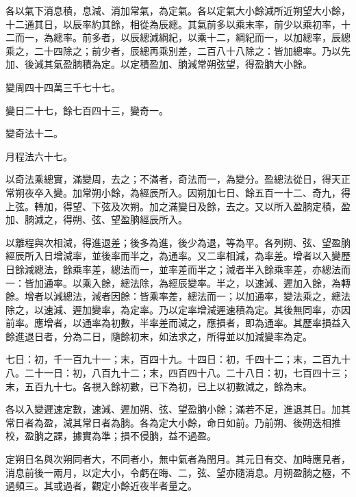 \begin{pinyinscope}
 各以氣下消息積，息減、消加常氣，為定氣。各以定氣大小餘減所近朔望大小餘，十二通其日，以辰率約其餘，相從為辰總。其氣前多以乘末率，前少以乘初率，十二而一，為總率。前多者，以辰總減綱紀，以乘十二，綱紀而一，以加總率，辰總乘之，二十四除之；前少者，辰總再乘別差，二百八十八除之：皆加總率。乃以先加、後減其氣盈朒積為定。以定積盈加、朒減常朔弦望，得盈朒大小餘。



 變周四十四萬三千七十七。



 變日二十七，餘七百四十三，變奇一。



 變奇法十二。



 月程法六十七。



 以奇法乘總實，滿變周，去之；不滿者，奇法而一，為變分。盈總法從日，得天正常朔夜卒入變。加常朔小餘，為經辰所入。因朔加七日、餘五百一十二、奇九，得上弦。轉加，得望、下弦及次朔。加之滿變日及餘，去之。又以所入盈朒定積，盈加、朒減之，得朔、弦、望盈朒經辰所入。



 以離程與次相減，得進退差；後多為進，後少為退，等為平。各列朔、弦、望盈朒經辰所入日增減率，並後率而半之，為通率。又二率相減，為率差。增者以入變歷日餘減總法，餘乘率差，總法而一，並率差而半之；減者半入餘乘率差，亦總法而一：皆加通率。以乘入餘，總法除，為經辰變率。半之，以速減、遲加入餘，為轉餘。增者以減總法，減者因餘：皆乘率差，總法而一；以加通率，變法乘之，總法除之，以速減、遲加變率，為定率。乃以定率增減遲速積為定。其後無同率，亦因前率。應增者，以通率為初數，半率差而減之，應損者，即為通率。其歷率損益入餘進退日者，分為二日，隨餘初末，如法求之，所得並以加減變率為定。



 七日：初，千一百九十一；末，百四十九。十四日：初，千四十二；末，二百九十八。二十一日：初，八百九十二；末，四百四十八。二十八日：初，七百四十三；末，五百九十七。各視入餘初數，已下為初，已上以初數減之，餘為末。



 各以入變遲速定數，速減、遲加朔、弦、望盈朒小餘；滿若不足，進退其日。加其常日者為盈，減其常日者為朒。各為定大小餘，命日如前。乃前朔、後朔迭相推校，盈朒之課，據實為準；損不侵朒，益不過盈。



 定朔日名與次朔同者大，不同者小，無中氣者為閏月。其元日有交、加時應見者，消息前後一兩月，以定大小，令虧在晦、二，弦、望亦隨消息。月朔盈朒之極，不過頻三。其或過者，觀定小餘近夜半者量之。




\end{pinyinscope}
